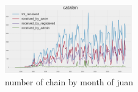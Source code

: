 \begin{figure}[H]
    \includegraphics[width=0.49\textwidth]{./chapters/04/assets/revert_received_ca.png}
    \caption{number of chain by month of juan}
    \label{fig:revuser}
\end{figure}







